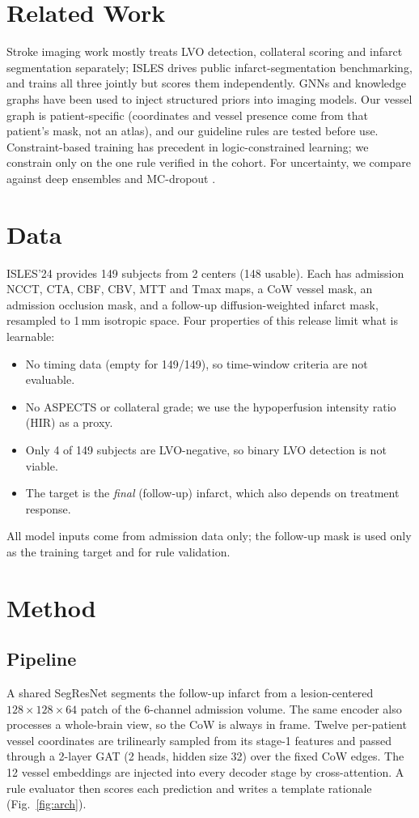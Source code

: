 \documentclass[conference]{IEEEtran}
\begin{document}
\section{Related Work}
Stroke imaging work mostly treats LVO detection, collateral scoring and infarct segmentation separately; ISLES \cite{isles2024} drives public infarct-segmentation benchmarking, and \cite{luan2026} trains all three jointly but scores them independently. GNNs and knowledge graphs have been used to inject structured priors into imaging models. Our vessel graph is patient-specific (coordinates and vessel presence come from that patient's mask, not an atlas), and our guideline rules are tested before use. Constraint-based training has precedent in logic-constrained learning; we constrain only on the one rule verified in the cohort. For uncertainty, we compare against deep ensembles \cite{lakshminarayanan2017} and MC-dropout \cite{gal2016dropout}.

\section{Data}
ISLES'24 provides 149 subjects from 2 centers (148 usable). Each has admission NCCT, CTA, CBF, CBV, MTT and Tmax maps, a CoW vessel mask, an admission occlusion mask, and a follow-up diffusion-weighted infarct mask, resampled to 1\,mm isotropic space. Four properties of this release limit what is learnable:
\begin{itemize}
\item No timing data (empty for 149/149), so time-window criteria are not evaluable.
\item No ASPECTS or collateral grade; we use the hypoperfusion intensity ratio (HIR) \cite{olivot2014} as a proxy.
\item Only 4 of 149 subjects are LVO-negative, so binary LVO detection is not viable.
\item The target is the \emph{final} (follow-up) infarct, which also depends on treatment response.
\end{itemize}
All model inputs come from admission data only; the follow-up mask is used only as the training target and for rule validation.

\section{Method}
\subsection{Pipeline}
A shared SegResNet \cite{myronenko2018} segments the follow-up infarct from a lesion-centered $128{\times}128{\times}64$ patch of the 6-channel admission volume. The same encoder also processes a whole-brain view, so the CoW is always in frame. Twelve per-patient vessel coordinates are trilinearly sampled from its stage-1 features and passed through a 2-layer GAT \cite{velickovic2018} (2 heads, hidden size 32) over the fixed CoW edges. The 12 vessel embeddings are injected into every decoder stage by cross-attention. A rule evaluator then scores each prediction and writes a template rationale (Fig.~\ref{fig:arch}).
\end{document}
